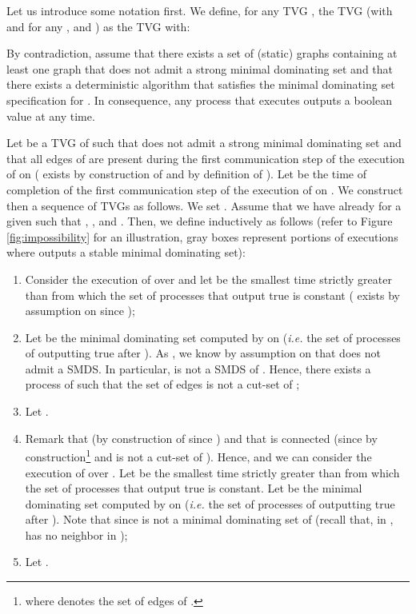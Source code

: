 \documentclass{article}
\newenvironment{proof}{{\bf Proof. } }{{\hfill }}
\begin{document}
\begin{proof}
Let us introduce some notation first. We define, for any TVG ,  the TVG  (with  and for any ,  and ) as the TVG  with:


By contradiction, assume that there exists a set of (static) graphs  containing at least one graph that does not admit a strong minimal dominating set and that there exists a deterministic algorithm  that satisfies the minimal dominating set specification for . In consequence, any process that executes  outputs a boolean value at any time.

Let  be a TVG of  such that  does not admit a strong minimal dominating set and that all edges of  are present during the first communication step of the execution of  on  ( exists by construction of  and by definition of ). Let  be the time of completion of the first communication step of the execution of  on . We construct then a sequence  of TVGs as follows. We set . Assume that we have already  for a given  such that , , and . Then, we define inductively  as follows (refer to Figure \ref{fig:impossibility} for an illustration, gray boxes represent portions of executions where  outputs a stable minimal dominating set):

\begin{enumerate}
\item Consider the execution of  over  and let  be the smallest time strictly greater than  from which the set of processes that output true is constant ( exists by assumption on  since );
\item Let  be the minimal dominating set computed by  on  (\emph{i.e.} the set of processes of  outputting true after ). As , we know by assumption on  that  does not admit a SMDS. In particular,  is not a SMDS of . Hence, there exists a process  of  such that the set of edges   is not a cut-set of ; 
\item Let .
\item Remark that  (by construction of  since ) and that  is connected (since  by construction\footnote{where  denotes the set of edges of .} and  is not a cut-set of ). Hence,  and we can consider the execution of  over . Let  be the smallest time strictly greater than  from which the set of processes that output true is constant. Let  be the minimal dominating set computed by  on  (\emph{i.e.} the set of processes of  outputting true after ). Note that  since  is not a minimal dominating set of  (recall that, in ,  has no neighbor in );
\item Let .
\end{enumerate}


\end{proof}
\end{document}
